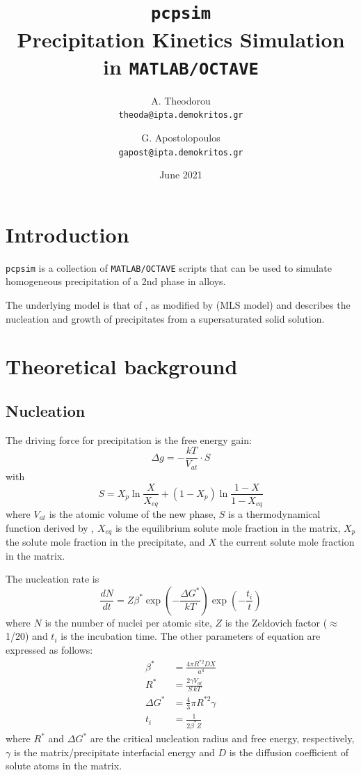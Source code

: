 \documentclass[12pt,a4paper]{article}
\author{
  A. Theodorou\\
  \texttt{theoda@ipta.demokritos.gr}
  \and
  G. Apostolopoulos\\
  \texttt{gapost@ipta.demokritos.gr}
}
\date{June 2021}
\title{\texttt{pcpsim} \\ 
Precipitation Kinetics Simulation in \texttt{MATLAB/OCTAVE}
}
\begin{document}
\maketitle

\section{Introduction}
\texttt{pcpsim} is a collection of \texttt{MATLAB/OCTAVE} scripts that can be used to simulate homogeneous precipitation of a 2nd phase in alloys. 

The underlying model is that of \citet{Langer-1980-Kineticsofnucleati}, as modified by \citet{Kampmann-1984-KINETICSOFPRECIPIT} (MLS model) and describes the nucleation and growth of  precipitates from a supersaturated solid solution.


\section{Theoretical background}

\subsection{Nucleation}

The driving force for precipitation is the free energy gain: 
\begin{equation}
\Delta g = - \frac{kT}{V_{at}} \cdot S 
\end{equation}
with
\begin{equation}
S =  X_p \ln\frac{X}{X_{eq}} + (1 - X_p) \ln\frac{1 - X}{1-X_{eq}} 
\end{equation}
where $V_{at}$ is the atomic volume of the new phase, $S$ is a thermodynamical function derived by \citet{Aaronson-1970-Thevolumefreeener}, $X_{eq}$ is the equilibrium solute mole fraction in the matrix, $X_p$ the solute mole fraction in the precipitate, and $X$ the current solute mole fraction in the matrix. 

The nucleation rate is \citep{Kampmann-1984-KINETICSOFPRECIPIT}
\begin{equation}
\label{eq:nucleation}
\frac{d N}{d t} = Z \beta^* \exp(-\frac{\Delta G^*}{kT}) \exp(-\frac{t_i}{t})
\end{equation}
where $N$ is the number of nuclei per atomic site, $Z$ is the Zeldovich factor ($\approx$ 1/20) and $t_i$ is the incubation time. The other parameters of equation are expressed as follows:
\begin{subequations}
	\begin{align}
\beta^* &= \frac{4\pi R^{*2} D X}{a^4} \\
R^* &= \frac{2\gamma V_{at}}{S\,kT} \\
\Delta G^* &= \frac{4}{3}\pi R^{*2}\gamma \\
t_i &= \frac{1}{2\beta^* Z} 
	\end{align}	
\end{subequations}
where $R^*$ and $\Delta G^*$ are the critical nucleation radius and free energy, respectively, $\gamma$ is the matrix/precipitate interfacial energy and $D$ is the diffusion coefficient of solute atoms in the matrix.
\end{document}
